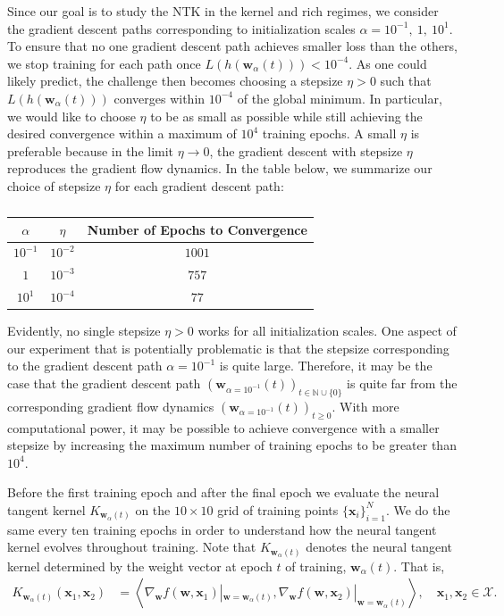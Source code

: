 \documentclass{article}
\begin{document}
Since our goal is to study the NTK in the kernel and rich regimes, we consider the gradient descent paths corresponding to initialization scales $\alpha = 10^{-1}, \ 1, \ 10^{1}$. To ensure that no one gradient descent path achieves smaller loss than the others, we stop training for each path once $L(h(\boldsymbol{w}_{\alpha}(t))) < 10^{-4}$. As one could likely predict, the challenge then becomes choosing a stepsize $\eta > 0$ such that $L(h(\boldsymbol{w}_{\alpha}(t)))$ converges within $10^{-4}$ of the global minimum. In particular, we would like to choose $\eta$ to be as small as possible while still achieving the desired convergence within a maximum of $10^4$ training epochs. A small $\eta$ is preferable because in the limit $\eta \rightarrow 0$, the gradient descent with stepsize $\eta$ reproduces the gradient flow dynamics. In the table below, we summarize our choice of stepsize $\eta$ for each gradient descent path:
\begin{table}[H]
\centering
\begin{tabular}{ c|c|c } 
$\alpha$ & $\eta$ & Number of Epochs to Convergence \\
\hline
$10^{-1}$ & $10^{-2}$ & $1001$ \\ 
$1$ & $10^{-3}$ & $757$ \\
$10^1$ & $10^{-4}$ & $77$
\end{tabular}
\caption{}\label{table:NTK}
\end{table}
Evidently, no single stepsize $\eta > 0$ works for all initialization scales. One aspect of our experiment that is potentially problematic is that the stepsize corresponding to the gradient descent path $\alpha = 10^{-1}$ is quite large. Therefore, it may be the case that the gradient descent path $(\boldsymbol{w}_{\alpha = 10^{-1}}(t))_{t \in \mathbb{N} \cup \{ 0 \}}$ is quite far from the corresponding gradient flow dynamics $(\boldsymbol{w}_{\alpha = 10^{-1}}(t))_{t\geq 0}$. With more computational power, it may be possible to achieve convergence with a smaller stepsize by increasing the maximum number of training epochs to be greater than $10^4$.

Before the first training epoch and after the final epoch we evaluate the neural tangent kernel $K_{\boldsymbol{w}_{\alpha}(t)}$ on the $10 \times 10$ grid of training points $\{ \boldsymbol{x}_i \}_{i=1}^N$. We do the same every ten training epochs in order to understand how the neural tangent kernel evolves throughout training. Note that $K_{\boldsymbol{w}_{\alpha}(t)}$ denotes the neural tangent kernel determined by the weight vector at epoch $t$ of training, $\boldsymbol{w}_{\alpha}(t)$. That is, 
\begin{align*}
    K_{\boldsymbol{w}_{\alpha}(t)}(\boldsymbol{x}_1, \boldsymbol{x}_2) &= \left\langle \nabla_{\boldsymbol{w}}f(\boldsymbol{w}, \boldsymbol{x}_1)|_{\boldsymbol{w} = \boldsymbol{w}_{\alpha}(t)}, \nabla_{\boldsymbol{w}}f(\boldsymbol{w}, \boldsymbol{x}_2)|_{\boldsymbol{w} = \boldsymbol{w}_{\alpha}(t)} \right\rangle, \quad \boldsymbol{x}_1, \boldsymbol{x}_2 \in \mathcal{X}.
\end{align*}
\end{document}
